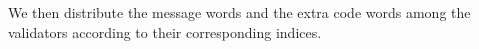 We then distribute the message words and the extra code words among the validators according to their corresponding indices.








